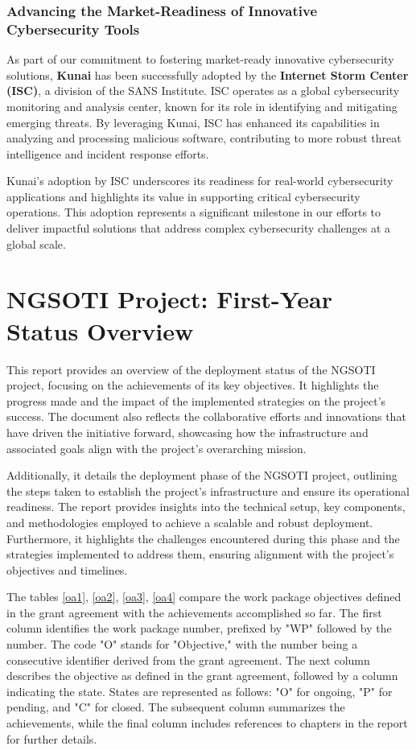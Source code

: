 \subsection*{Advancing the Market-Readiness of Innovative Cybersecurity Tools}

As part of our commitment to fostering market-ready innovative cybersecurity 
solutions, \textbf{Kunai} has been successfully adopted by the
\textbf{Internet Storm Center (ISC)}\cite{kunai_isc_sans}, a division of the
SANS Institute. ISC operates as a global cybersecurity monitoring and analysis
center, known for its role in identifying and mitigating emerging threats.
By leveraging Kunai, ISC has enhanced its capabilities in analyzing and
processing malicious software, contributing to more robust threat intelligence
and incident response efforts.

Kunai's adoption by ISC underscores its readiness for real-world
cybersecurity applications and highlights its value in supporting critical
cybersecurity operations. This adoption represents a significant milestone in
our efforts to deliver impactful solutions that address complex cybersecurity
challenges at a global scale.

\chapter{NGSOTI Project: First-Year Status Overview}

This report provides an overview of the deployment status of the NGSOTI project,
focusing on the achievements of its key objectives. It highlights the progress
made and the impact of the implemented strategies on the project's success.
The document also reflects the collaborative efforts and innovations that have
driven the initiative forward, showcasing how the infrastructure and associated
goals align with the project's overarching mission.

Additionally, it details the deployment phase of the NGSOTI project, outlining
the steps taken to establish the project's infrastructure and ensure its
operational readiness. The report provides insights into the technical setup,
key components, and methodologies employed to achieve a scalable and robust
deployment. Furthermore, it highlights the challenges encountered during this
phase and the strategies implemented to address them, ensuring alignment with
the project's objectives and timelines.

The tables \ref{oa1}, \ref{oa2}, \ref{oa3}, \ref{oa4} compare the work package
objectives defined in the grant agreement with the achievements accomplished
so far. The first column identifies the work package number, prefixed by "WP"
followed by the number. The code "O" stands for "Objective," with the number
being a consecutive identifier derived from the grant agreement.
The next column describes the objective as defined in the grant agreement,
followed by a column indicating the state. States are represented as
follows: "O" for ongoing, "P" for pending, and "C" for closed. The subsequent
column summarizes the achievements, while the final column includes references
to chapters in the report for further details.

